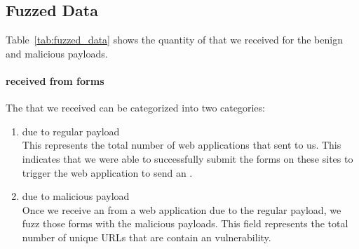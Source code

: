 \subsection{Fuzzed Data}
Table~\ref{tab:fuzzed_data} shows the quantity of \emails that we received for the benign and malicious payloads. 

\paragraph{\Email received from forms}
The \emails that we received can be categorized into two categories:
\begin{enumerate}
	\item \Emails due to regular payload\\
	This represents the total number of web applications that sent \emails to us. This indicates that we were able to successfully submit the forms on these sites to trigger the web application to send an \email.
	
	\item \Emails due to malicious payload\\
    Once we receive an \email from a web application due to the regular payload, we fuzz those forms with the malicious payloads. This field represents the total number of unique URLs that are  contain an \ehi vulnerability.
\end{enumerate}



